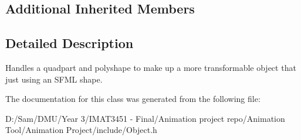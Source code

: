 \subsection*{Additional Inherited Members}


\subsection{Detailed Description}
Handles a quadpart and polyshape to make up a more transformable object that just using an S\+F\+ML shape. 

The documentation for this class was generated from the following file\+:\begin{DoxyCompactItemize}
\item 
D\+:/\+Sam/\+D\+M\+U/\+Year 3/\+I\+M\+A\+T3451 -\/ Final/\+Animation project repo/\+Animation Tool/\+Animation Project/include/Object.\+h\end{DoxyCompactItemize}
